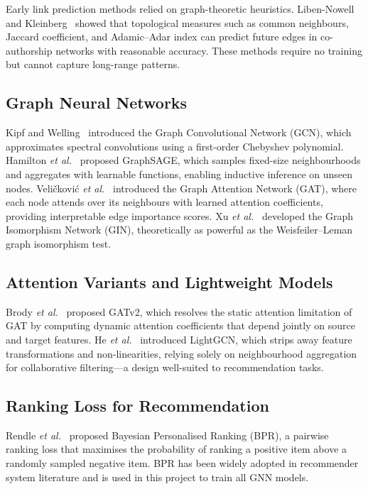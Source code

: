 \documentclass[12pt,a4paper]{article}
\begin{document}
Early link prediction methods relied on graph-theoretic heuristics. Liben-Nowell and Kleinberg~\cite{libennowell2007} showed that topological measures such as common neighbours, Jaccard coefficient, and Adamic--Adar index can predict future edges in co-authorship networks with reasonable accuracy. These methods require no training but cannot capture long-range patterns.

\subsection{Graph Neural Networks}

Kipf and Welling~\cite{kipf2017} introduced the Graph Convolutional Network (GCN), which approximates spectral convolutions using a first-order Chebyshev polynomial. Hamilton \textit{et al.}~\cite{hamilton2017} proposed GraphSAGE, which samples fixed-size neighbourhoods and aggregates with learnable functions, enabling inductive inference on unseen nodes. Veli{\v{c}}kovi{\'c} \textit{et al.}~\cite{velickovic2018} introduced the Graph Attention Network (GAT), where each node attends over its neighbours with learned attention coefficients, providing interpretable edge importance scores. Xu \textit{et al.}~\cite{xu2019} developed the Graph Isomorphism Network (GIN), theoretically as powerful as the Weisfeiler--Leman graph isomorphism test.

\subsection{Attention Variants and Lightweight Models}

Brody \textit{et al.}~\cite{brody2022} proposed GATv2, which resolves the static attention limitation of GAT by computing dynamic attention coefficients that depend jointly on source and target features. He \textit{et al.}~\cite{he2020} introduced LightGCN, which strips away feature transformations and non-linearities, relying solely on neighbourhood aggregation for collaborative filtering---a design well-suited to recommendation tasks.

\subsection{Ranking Loss for Recommendation}

Rendle \textit{et al.}~\cite{rendle2009} proposed Bayesian Personalised Ranking (BPR), a pairwise ranking loss that maximises the probability of ranking a positive item above a randomly sampled negative item. BPR has been widely adopted in recommender system literature and is used in this project to train all GNN models.
\end{document}
